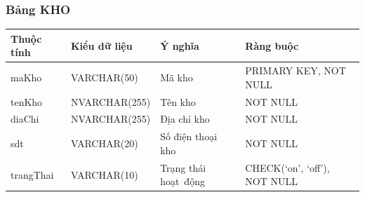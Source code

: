 \documentclass[a4paper,12pt]{report}
\begin{document}
\subsubsection{Bảng KHO}
\noindent
\begin{center}
    \begin{tabular}{|>{\centering\arraybackslash}p{3cm}|
        >{\centering\arraybackslash}p{4cm}|
        >{\centering\arraybackslash}p{4cm}|
        >{\centering\arraybackslash}p{4cm}|}
        \hline
        \textbf{Thuộc tính}                                                                                                               &
        \textbf{Kiểu dữ liệu}                                                                                                                             &
        \textbf{Ý nghĩa}                                                                                                 &
        \textbf{Ràng buộc}                                                                                                         \\
        \hline
        maKho &  VARCHAR(50)  & Mã kho & PRIMARY KEY, NOT NULL \\
        \hline
        tenKho &  NVARCHAR(255)  & Tên kho & NOT NULL \\                                                                                                                          
        \hline
        diaChi & NVARCHAR(255) & Địa chỉ kho & NOT NULL \\                                                                                                                          
        \hline
        sdt & VARCHAR(20) & Số điện thoại kho & NOT NULL \\                                                                                                                          
        \hline
        trangThai &  VARCHAR(10)  & Trạng thái hoạt~động & CHECK(‘on’, ‘off’), NOT NULL \\
        \hline
    \end{tabular}
\end{center}
\end{document}
